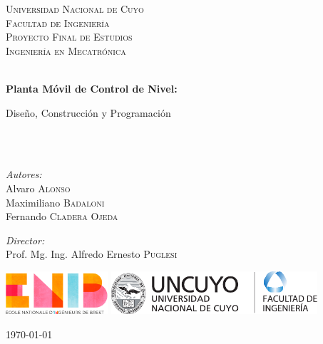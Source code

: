 \begin{titlepage}

\begin{center}


\textsc{\LARGE Universidad Nacional de Cuyo}\\[1.5cm]
\textsc{\LARGE Facultad de Ingeniería}\\[1.5cm]

\textsc{\Large Proyecto Final de Estudios}\\[0.5cm]
\textsc{\Large Ingeniería en Mecatrónica }\\[0.5cm]

\HRule \\[0.4cm]
{ \huge \bfseries Planta Móvil de Control de Nivel:

Diseño, Construcción y Programación}\\[0.4cm]

\HRule \\[1.5cm]

\begin{minipage}{0.4\textwidth}
\begin{flushleft} \large
\emph{Autores:}\\
Alvaro \textsc{Alonso} \\
Maximiliano \textsc{Badaloni} \\
Fernando \textsc{Cladera Ojeda}
\end{flushleft}
\end{minipage}
\begin{minipage}{0.4\textwidth}
\begin{flushright} \large
\emph{Director:} \\
Prof. Mg. Ing. Alfredo Ernesto \textsc{Puglesi}
\end{flushright}
\end{minipage}

\vfill

\begin{minipage}[c]{0.9\textwidth}
  \centering
  \includegraphics[height=16mm]{Caratula/Logos/ENIB-cmjn.png}
  \hfill
  \includegraphics[height=16mm]{Caratula/Logos/LogoFacu.pdf}
\end{minipage}

\vspace{1cm}

{\large \today}

\end{center}

\end{titlepage}